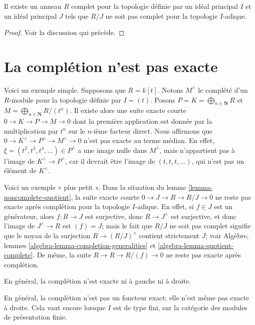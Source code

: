 \begin{lemma}
\label{lemma-noncomplete-quotient}
Il existe un anneau $R$ complet pour la topologie définie par un idéal principal
$I$ et un idéal principal $J$ tels que $R/J$ ne soit pas complet pour la topologie
$I$-adique.
\end{lemma}

\begin{proof}
Voir la discussion qui précède.
\end{proof}



\section{La complétion n'est pas exacte}
\label{section-completion-not-exact}

\noindent
Voici un exemple simple. Supposons que $R = k[t]$. Notons $M^\wedge$
le complété d'un $R$-module pour la topologie définie par $I = (t)$. Posons
$P = K = \bigoplus_{n \in \mathbf{N}} R$ et
$M = \bigoplus_{n \in \mathbf{N}} R/(t^n)$. Il existe alors une suite exacte courte
$0 \to K \to P \to M \to 0$ dont la première application est donnée par la
multiplication par $t^n$ sur le $n$-ième facteur direct. Nous affirmons que
$0 \to K^\wedge \to P^\wedge \to M^\wedge \to 0$ n'est pas exacte au terme médian.
En effet, $\xi = (t^2, t^3, t^4, \ldots) \in P^\wedge$ a une image nulle dans
$M^\wedge$, mais n'appartient pas à l'image de $K^\wedge \to P^\wedge$, car
il devrait être l'image de $(t, t, t, \ldots)$, qui n'est pas un élément de
$K^\wedge$.

\medskip\noindent
Voici un exemple « plus petit ». Dans la situation du
lemme \ref{lemma-noncomplete-quotient},
la suite exacte courte $0 \to J \to R \to R/J \to 0$ ne reste pas
exacte après complétion pour la topologie $I$-adique.
En effet, si $f \in J$ est un générateur, alors
$f : R \to J$ est surjective, donc $R \to J^\wedge$ est surjective, et donc
l'image de $J^\wedge \to R$ est $(f) = J$; mais le fait que
$R/J$ ne soit pas complet signifie que le noyau de la surjection
$R \to (R/J)^\wedge$ contient strictement $J$; voir
Algèbre, lemmes \ref{algebra-lemma-completion-generalities} et
\ref{algebra-lemma-quotient-complete}.
De même, la suite
$R \to R \to R/(f) \to 0$ ne reste pas exacte après complétion.

\begin{lemma}
\label{lemma-completion-not-exact}
\begin{slogan}
En général, la complétion n'est exacte ni à gauche ni à droite.
\end{slogan}
En général, la complétion n'est pas un foncteur exact; elle n'est même pas
exacte à droite. Cela vaut encore lorsque $I$ est de type fini,
sur la catégorie des modules de présentation finie.
\end{lemma}

